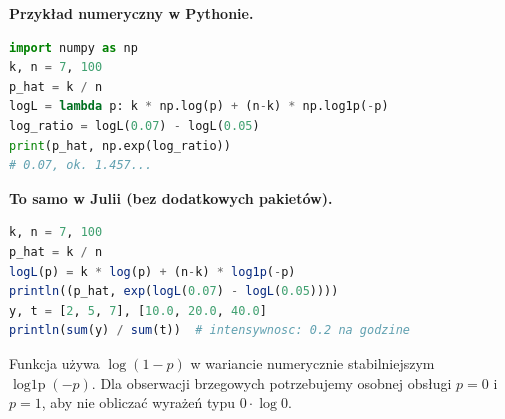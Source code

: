 \noindent\textbf{Przykład numeryczny w Pythonie.}\par
\par
{}
\smallskip
\begin{lstlisting}[language=Python,caption={Wiarygodność modelu Bernoulliego i iloraz wiarygodności (Python).}]
import numpy as np
k, n = 7, 100
p_hat = k / n
logL = lambda p: k * np.log(p) + (n-k) * np.log1p(-p)
log_ratio = logL(0.07) - logL(0.05)
print(p_hat, np.exp(log_ratio))
# 0.07, ok. 1.457...
\end{lstlisting}
\noindent\textbf{To samo w Julii (bez dodatkowych pakietów).}\par
\par
{}
\smallskip
\begin{lstlisting}[language=Julia,caption={Wiarygodność Bernoulliego i intensywność Poissona (Julia).}]
k, n = 7, 100
p_hat = k / n
logL(p) = k * log(p) + (n-k) * log1p(-p)
println((p_hat, exp(logL(0.07) - logL(0.05))))
y, t = [2, 5, 7], [10.0, 20.0, 40.0]
println(sum(y) / sum(t))  # intensywnosc: 0.2 na godzine
\end{lstlisting}

Funkcja używa $\log(1-p)$ w wariancie numerycznie stabilniejszym
$\operatorname{log1p}(-p)$. Dla obserwacji brzegowych potrzebujemy
osobnej obsługi $p=0$ i $p=1$, aby nie obliczać wyrażeń typu $0\cdot\log0$.

